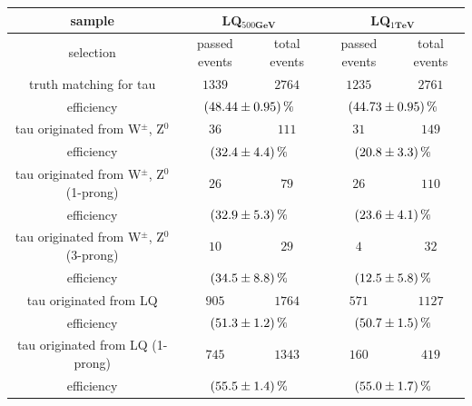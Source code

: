 	\begin{table}
		\centering
                \footnotesize
                \renewcommand{\arraystretch}{1.2}
		\begin{tabular*}{\linewidth}{@{\extracolsep{\fill}}ccccc}
		\hline
		\hline
		 \textbf{sample}  & \multicolumn{2}{c}{\textbf{LQ$_{500\textbf{GeV}}$}}  & \multicolumn{2}{c}{\textbf{LQ$_{1\textbf{TeV}}$}} 
		\\
		\hline
		selection  & passed events      & total events & passed events      & total events
		\\ 
		\hline
		truth matching for tau      & $1339$            & $2764$      & $1235$        & $2761$
		\\
		efficiency                  & \multicolumn{2}{c}{$\SI{48.44\pm 0.95}{\percent}$}    & \multicolumn{2}{c}{$\SI{44.73\pm 0.95}{\percent}$}
		\\
		\hline
		tau originated from W$^{\pm}$, Z$^0$& $36$        & $111$         & $31$          & $149$
		\\
		efficiency                  & \multicolumn{2}{c}{$\SI{32.4\pm 4.4}{\percent}$}   & \multicolumn{2}{c}{$\SI{20.8\pm 3.3}{\percent}$}
		\\
		\hline
                tau originated from W$^{\pm}$, Z$^0$ (1-prong)& $26$        & $79$         & $26$          & $110$
		\\
		efficiency                  & \multicolumn{2}{c}{$\SI{32.9\pm 5.3}{\percent}$}   & \multicolumn{2}{c}{$\SI{23.6\pm 4.1}{\percent}$}
		\\
		\hline
                tau originated from W$^{\pm}$, Z$^0$ (3-prong)& $10$        & $29$         & $4$          & $32$
		\\
		efficiency                  & \multicolumn{2}{c}{$\SI{34.5\pm 8.8}{\percent}$}   & \multicolumn{2}{c}{$\SI{12.5\pm 5.8}{\percent}$}
		\\
		\hline
                tau originated from LQ& $905$        & $1764$         & $571$          & $1127$
		\\
		efficiency                  & \multicolumn{2}{c}{$\SI{51.3\pm 1.2}{\percent}$}   & \multicolumn{2}{c}{$\SI{50.7\pm 1.5}{\percent}$}
		\\
		\hline
                tau originated from LQ (1-prong)& $745$        & $1343$         & $160$          & $419$
		\\
		efficiency                  & \multicolumn{2}{c}{$\SI{55.5\pm 1.4}{\percent}$}   & \multicolumn{2}{c}{$\SI{55.0\pm 1.7}{\percent}$}
		\\

\end{tabular*}
\end{table}
